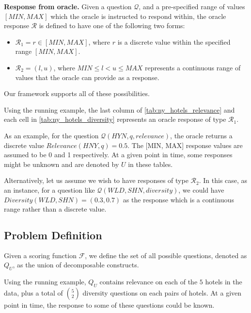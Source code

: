    
\textbf{Response from oracle.} Given a question \( \mathcal{Q} \), and a pre-specified range of values \([MIN, MAX]\) which the oracle is instructed to respond within, the oracle response \( \mathcal{R} \) is defined to have one of the following two forms:

\begin{itemize}
    \item \( \mathcal{R}_1 = r \in [MIN, MAX] \), where \( r \) is a discrete value within the specified range \([MIN, MAX]\).
    
    \item \( \mathcal{R}_2 = (l, u) \), where \( MIN \leq l < u \leq MAX \) represents a continuous range of values that the oracle can provide as a response.
\end{itemize}

Our framework supports all of these possibilities.


Using the running example, the last column of \autoref{tab:ny_hotels_relevance} and each cell in \autoref{tab:ny_hotels_diversity} represents an oracle response of type $\mathcal{R}_1$. 
    
As an example, for the question $\mathcal{Q}(HYN, q, relevance)$, the oracle returns a discrete value $Relevance(HNY, q) = 0.5$. The [MIN, MAX] response values are assumed to be 0 and 1 respectively. At a given point in time, some responses might be unknown and are denoted by $U$ in these tables.
    
Alternatively, let us assume we wish to have responses of type $\mathcal{R}_2$. In this case, as an instance, for a question like $\mathcal{Q}(WLD, SHN, diversity)$, we could have $Diversity(WLD, SHN) = (0.3, 0.7)$ as the response which is a continuous range rather than a discrete value. 



\subsection{Problem Definition}
Given a scoring function $\mathcal{F}$, we define the set of all possible questions, denoted as \( Q_U \), as the union of decomposable constructs.

Using the running example,  \( Q_U \) contains relevance on each of the $5$ hotels in the data, plus a total of $\binom{5}{2}$ diversity questions on each pairs of hotels. At a given point in time, the response to some of these questions could be known. 

